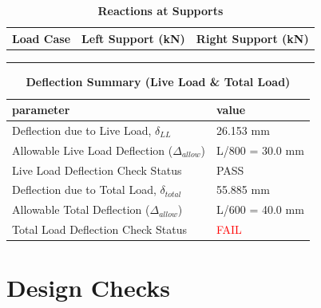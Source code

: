 \documentclass[12pt,a4paper]{report}
\numberwithin{table}{chapter}
\numberwithin{figure}{chapter}
\begin{document}
\vspace{1em}
\begin{longtable}{|>{\centering\arraybackslash}p{5.2cm}|>{\centering\arraybackslash}p{5.2cm}|>{\centering\arraybackslash}p{5.2cm}|}
\caption{\textbf{Reactions at Supports}}
\hline
\textbf{Load Case} & \textbf{Left Support (kN)} & \textbf{Right Support (kN)} \\[6pt]
\hline
 &  &  \\[6pt]
\hline
 &  &  \\[6pt]
\hline
 &  &  \\[6pt]
\hline
\end{longtable}

\vspace{1em}
\begin{longtable}{|L{7cm}|p{8.5cm}|}
\caption{\textbf{Deflection Summary (Live Load \& Total Load)}}
\hline
\textbf{parameter} & \textbf{value} \\
\hline
\textnormal{Deflection due to Live Load, $\delta_{LL}$} & 26.153 mm \\[6pt]
\hline
\textnormal{Allowable Live Load Deflection ($\Delta_{allow}$)} & L/800 = 30.0 mm \\[6pt]
\hline
\textnormal{Live Load Deflection Check Status} & PASS \\[6pt]
\hline
\textnormal{Deflection due to Total Load, $\delta_{total}$} & 55.885 mm \\[6pt]
\hline
\textnormal{Allowable Total Deflection ($\Delta_{allow}$)} & L/600 = 40.0 mm \\[6pt]
\hline
\textnormal{Total Load Deflection Check Status} & \textcolor{red}{FAIL} \\[6pt]
\hline
\end{longtable}

\vspace{1em}
\noindent
\noindent{}
\noindent{}
\noindent{}


\chapter{Design Checks}
\end{document}
